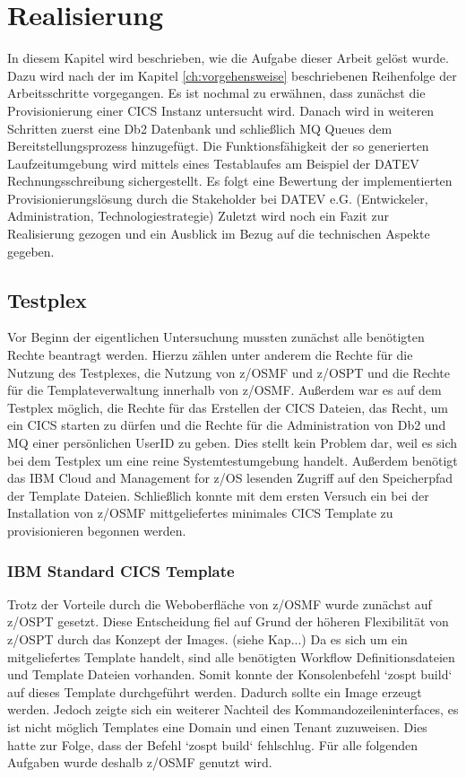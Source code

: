 \chapter{Realisierung}\label{ch:realisierung}
In diesem Kapitel wird beschrieben, wie die Aufgabe dieser Arbeit gelöst wurde.
Dazu wird nach der im Kapitel \ref{ch:vorgehensweise} beschriebenen Reihenfolge der Arbeitsschritte vorgegangen.
Es ist nochmal zu erwähnen, dass zunächst die Provisionierung einer CICS Instanz untersucht wird.
Danach wird in weiteren Schritten zuerst eine Db2 Datenbank und schließlich MQ Queues dem Bereitstellungsprozess hinzugefügt.
Die Funktionsfähigkeit der so generierten Laufzeitumgebung wird mittels eines Testablaufes am Beispiel der DATEV Rechnungsschreibung  sichergestellt. 
Es folgt eine Bewertung der implementierten Provisionierungslösung durch die Stakeholder bei DATEV e.G. (Entwickeler, Administration, Technologiestrategie)
Zuletzt wird noch ein Fazit zur Realisierung gezogen und ein Ausblick im Bezug auf die technischen Aspekte gegeben.

\section{Testplex}
Vor Beginn der eigentlichen Untersuchung mussten zunächst alle benötigten Rechte beantragt werden.
Hierzu zählen unter anderem die Rechte für die Nutzung des Testplexes, die Nutzung von z/OSMF und z/OSPT und die Rechte für die Templateverwaltung innerhalb von z/OSMF.
Außerdem war es auf dem Testplex möglich, die Rechte für das Erstellen der CICS Dateien, das Recht, um ein CICS starten zu dürfen und die Rechte für die Administration von Db2 und MQ einer persönlichen UserID zu geben.
Dies stellt kein Problem dar, weil es sich bei dem Testplex um eine reine Systemtestumgebung handelt.
Außerdem benötigt das IBM Cloud and Management for z/OS lesenden Zugriff auf den Speicherpfad der Template Dateien.
Schließlich konnte mit dem ersten Versuch ein bei der Installation von z/OSMF mittgeliefertes minimales CICS Template zu provisionieren begonnen werden.

\subsection{IBM Standard CICS Template}
Trotz der Vorteile durch die Weboberfläche von z/OSMF wurde zunächst auf z/OSPT gesetzt.
Diese Entscheidung fiel auf Grund der höheren Flexibilität von z/OSPT durch das Konzept der Images. (siehe Kap...)
Da es sich um ein mitgeliefertes Template handelt, sind alle benötigten Workflow Definitionsdateien und Template Dateien vorhanden.
Somit konnte der Konsolenbefehl `zospt build` auf dieses Template durchgeführt werden.
Dadurch sollte ein Image erzeugt werden.
Jedoch zeigte sich ein weiterer Nachteil des Kommandozeileninterfaces, es ist nicht möglich Templates eine Domain und einen Tenant zuzuweisen.
Dies hatte zur Folge, dass der Befehl `zospt build` fehlschlug.
Für alle folgenden Aufgaben wurde deshalb z/OSMF genutzt wird.

